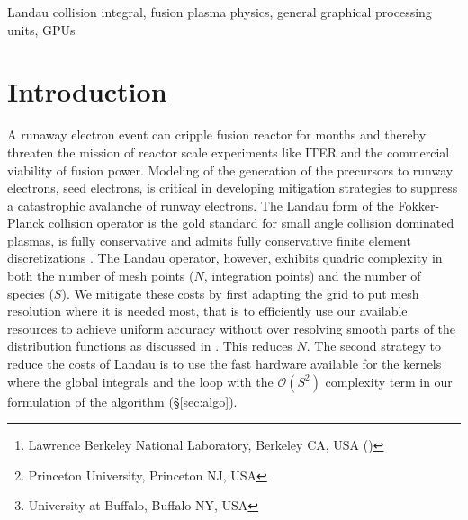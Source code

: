 \documentclass[12pt]{siamart}
\title{{\TheTitle}}
\author{
  Mark F. Adams\thanks{Lawrence Berkeley National Laboratory, Berkeley CA, USA (\email{mfadams@lbl.gov})}
 \and
 Dylan Brennan \thanks{Princeton University, Princeton NJ, USA}
 \and
  Matthew G. Knepley\thanks{ University at Buffalo, Buffalo NY, USA}
}
\newcommand{\Order}[1]{\ensuremath{\mathcal{O}(#1)}}    %
\begin{document}
\date{}

\maketitle

\begin{abstract}
Runaway electron (RE) events are catastrophic to tokamak experimental reactors and pose an existential threat to the development of commercial fusion reactors.
We seek to understand the generation of ``seed" electrons, which are the precursors of REs, with accurate velocity space models using fully conserving, structure preserving, discretizations of the Fokker-Planck collision operator in Landau form.
We continue the development of a high-performance implementation of these discretizations with verification studies and the extension of earlier work on vectorization to general graphical processing units (GPUs).
We investigate seed electron generation as a function of exogenous parameters such as quench rates, heavy ion injection rates from common mitigation strategies, plasma temperature, etc.
\end{abstract}


\begin{keywords}
  Landau collision integral, fusion plasma physics, general graphical processing units, GPUs
\end{keywords}

\section{Introduction}

A runaway electron event can cripple fusion reactor for months and thereby threaten the mission of reactor scale experiments like ITER and the commercial viability of fusion power.
Modeling of the generation of the precursors to runway electrons, seed electrons, is critical in developing mitigation strategies to suppress a catastrophic avalanche of runway electrons.
The Landau form of the Fokker-Planck collision operator is the gold standard for small angle collision dominated plasmas, is fully conservative and admits fully conservative finite element discretizations \cite{Hirvijoki2016,AdamsHirvijokiKnepleyBrownIsaacMills2017}.
The Landau operator, however, exhibits quadric complexity in both the number of mesh points ($N$, integration points) and the number of species ($S$).
We mitigate these costs by first adapting the grid to put mesh resolution where it is needed most, that is to efficiently use our available resources to achieve uniform accuracy without over resolving smooth parts of the distribution functions as discussed in \cite{AdamsHirvijokiKnepleyBrownIsaacMills2017}.
This reduces $N$.
The second strategy to reduce the costs of Landau is to use the fast hardware available for the kernels where the global integrals and the loop with the $\Order{S^2}$ complexity term in our formulation of the algorithm (\S\ref{sec:algo}).
\end{document}
